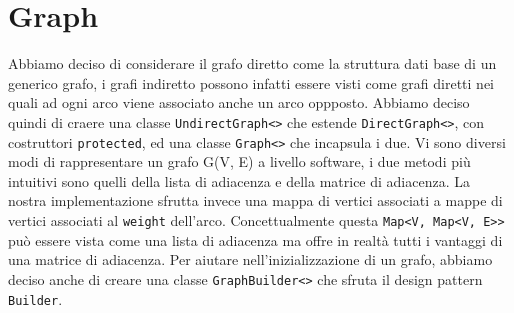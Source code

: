 \documentclass[letterpaper]{report}
\begin{document}
\section{Graph}
Abbiamo deciso di considerare il grafo diretto come la struttura dati base di un 
generico grafo, i grafi indiretto possono infatti essere visti come grafi diretti 
nei quali ad ogni arco viene associato anche un arco oppposto. Abbiamo deciso quindi 
di craere una classe \verb|UndirectGraph<>| che estende \verb|DirectGraph<>|, con 
costruttori \verb|protected|, ed una classe \verb|Graph<>| che incapsula i due.
\newline
\newline
Vi sono diversi modi di rappresentare un grafo G(V, E) a livello software, i due metodi 
più intuitivi sono quelli della lista di adiacenza e della matrice di adiacenza.
La nostra implementazione sfrutta invece una mappa di vertici associati a mappe di 
vertici associati al \verb|weight| dell'arco. 
\newline
Concettualmente questa \verb|Map<V, Map<V, E>>| può essere vista come una lista di 
adiacenza ma offre in realtà tutti i vantaggi di una matrice di adiacenza.
\newline
\newline
Per aiutare nell'inizializzazione di un grafo, abbiamo deciso anche di creare una 
classe \verb|GraphBuilder<>| che sfruta il design pattern \verb|Builder|.
\end{document}
